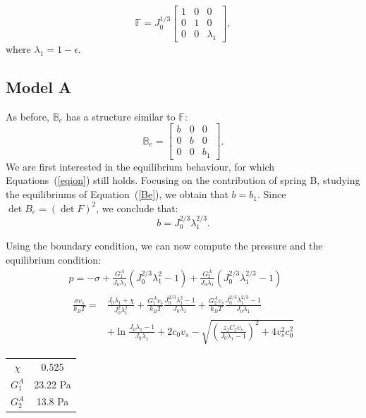 \documentclass[runningheads]{llncs}
\newcommand{\F}{\ensuremath{\mathbb{F}}}
\newcommand{\B}{\ensuremath{\mathbb{B}}}
\begin{document}
\begin{equation}
\F=J_0^{1/3}\begin{bmatrix}
1 &0&0\\
0&1&0\\
0&0& \lambda_1
\end{bmatrix}, 
\end{equation}
where $\lambda_1 = 1 - \epsilon$. 
\subsection{Model A}
As before, $\B_e$ has a structure similar to $\F$:
\begin{equation}
\B_e=\begin{bmatrix}
b &0&0\\
0&b&0\\
0&0& b_1
\end{bmatrix}. 
\end{equation}
We are first interested in the equilibrium behaviour, for which Equations~(\ref{eqion}) still holds. Focusing on the contribution of spring B, studying the equilibriums of Equation~(\ref{Be}), we obtain that $b=b_1$. Since $\det B_e= (\det F)^2$, we conclude that:
\begin{equation}
b = J_0^{2/3}\lambda_1^{2/3}.
\end{equation}

Using the boundary condition, we can now compute the pressure and the equilibrium condition:
\begin{gather}
p = -\sigma + \frac{G^A_1}{J_0\lambda_1} (J^{2/3}_0\lambda_1^2-1)+\frac{G^A_2}{J_0\lambda_1} (J_0^{2/3} \lambda_1^{2/3}-1) \\
\begin{aligned}
\frac{\sigma v_s}{k_B T}=&\frac{J_0\lambda_1+\chi}{J_0^2\lambda^2_1}+\frac{G_1^Av_s}{k_BT} \frac{J_0^{2/3}\lambda^2_1-1}{J_0 \lambda_1}+\frac{G_2^Av_s}{k_BT} \frac{J_0^{2/3}\lambda^{2/3}_1-1}{J_0 \lambda_1}\\[1.5mm]
&+\ln \frac{J_0\lambda_1-1}{J_0\lambda_1} +2c_0v_s-\sqrt{\left(\frac{z_fC_fv_s}{J_0\lambda_1-1}\right)^2+4v_s^2c^2_0}
\end{aligned}
\end{gather}
\begin{table}
	\begin{tabular}{c c}
		$\chi$ & 0.525\\
		$G^A_1$ & 23.22 Pa\\
		$G^A_2$ & 13.8 Pa
	\end{tabular}
\end{table}
\end{document}

